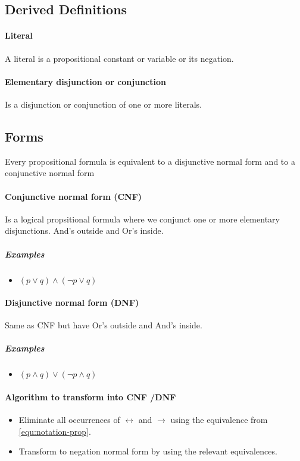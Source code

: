 \subsection{Derived Definitions}

\paragraph{Literal}
A literal is a propositional constant or variable or its negation. 


\paragraph{Elementary disjunction or conjunction}
Is a disjunction or conjunction of one or more literals.

\subsection{Forms}

Every propositional formula is equivalent to a disjunctive normal form and to a conjunctive normal form

\paragraph{Conjunctive normal form (CNF)}

Is a logical propsitional formula where we conjunct one or more elementary disjunctions. And's outside and Or's inside.

\subparagraph{Examples}

\begin{itemize}
\item $(p \lor q) \land (\neg p \lor q)$
\end{itemize}

\paragraph{Disjunctive normal form (DNF)}

Same as CNF but have Or's outside and And's inside.

\subparagraph{Examples}

\begin{itemize}
\item $(p \land q) \lor (\neg p \land q)$
\end{itemize}

\paragraph{Algorithm to transform into CNF /DNF}

\begin{itemize}
\item Eliminate all occurrences of $\leftrightarrow$ and $\to$ using the equivalence  from \ref{equ:notation-prop}.
\item Transform to negation normal form by using the relevant equivalences. 
\end{itemize}

